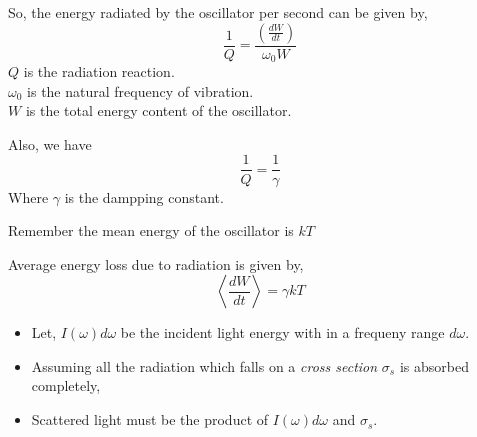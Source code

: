 \documentclass[aspectratio=169]{beamer}
\begin{document}
		
\begin{frame}
		
		So, the energy radiated  by the oscillator  per second can be given by, \newline
		{\large \[ \frac{1}{Q} = \frac{\left(\frac{dW}{dt}\right)}{\omega_0 W}\]}\newline
			{\small $Q$ is the radiation reaction. \\ $\omega_0$ is the natural frequency of vibration. \\ $W$ is the total energy content of the oscillator.} 
				
\end{frame}
	
		
\begin{frame}
		Also, we have 
		\[ \frac{1}{Q}= \frac{1}{\gamma} \] \newline
		{\small Where $\gamma$ is the dampping constant.} 
		\newline
		
		Remember the mean energy of the oscillator is $kT$
		
\end{frame}


\begin{frame}

	 \begin{center}
	 
	 	{\large Average energy loss due to radiation is given by,
	 	\[ \boxed{\left<\frac{dW}{dt}\right> = \gamma kT}\]	}
	 		
	 \end{center} 

\end{frame}
		
\begin{frame}
	
	\begin{itemize}
		
		\item Let, $ I(\omega)d\omega $ be the incident light energy with in a frequeny range $d\omega$. \newline
		\item Assuming all the radiation which falls on a \textit{cross section} $\sigma_s$ is absorbed completely, \newline
		\item Scattered light must be the product of $ I(\omega)d\omega $ and $ \sigma_s $. 

	\end{itemize}
	
\end{frame}
			
\end{document}
